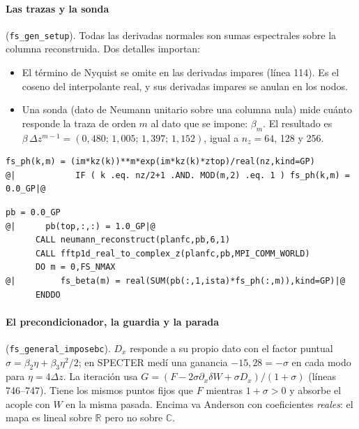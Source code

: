 \documentclass[11pt,a4paper]{article}
\begin{document}
\paragraph{Las trazas y la sonda} (\texttt{fs\_gen\_setup}). Todas las derivadas normales son
sumas espectrales sobre la columna reconstruida. Dos detalles importan:
\begin{itemize}
\item El término de Nyquist se omite en las derivadas impares (línea 114). Es el coseno del
  interpolante real, y sus derivadas impares se anulan en los nodos.
\item Una sonda (dato de Neumann unitario sobre una columna nula) mide cuánto responde la traza
  de orden $m$ al dato que se impone: $\beta_m$. El resultado es
  $\beta\,\Delta z^{m-1}=(0{,}480;\,1{,}005;\,1{,}397;\,1{,}152)$, igual a $n_z=64$, 128 y 256.
\end{itemize}
\begin{lstlisting}[style=f90,firstnumber=113]
            fs_ph(k,m) = (im*kz(k))**m*exp(im*kz(k)*ztop)/real(nz,kind=GP)
@|            IF ( k .eq. nz/2+1 .AND. MOD(m,2) .eq. 1 ) fs_ph(k,m) = 0.0_GP|@
\end{lstlisting}
\vspace{-2pt}
\begin{lstlisting}[style=f90,firstnumber=128]
      pb = 0.0_GP
@|      pb(top,:,:) = 1.0_GP|@
      CALL neumann_reconstruct(planfc,pb,6,1)
      CALL fftp1d_real_to_complex_z(planfc,pb,MPI_COMM_WORLD)
      DO m = 0,FS_NMAX
@|         fs_beta(m) = real(SUM(pb(:,1,ista)*fs_ph(:,m)),kind=GP)|@
      ENDDO
\end{lstlisting}

\paragraph{El precondicionador, la guardia y la parada} (\texttt{fs\_general\_imposebc}).
$D_x$ responde a su propio dato con el factor puntual $\sigma=\beta_2\eta+\beta_3\eta^2/2$; en
SPECTER medí una ganancia $-15{,}28=-\sigma$ en cada modo para $\eta=4\Delta z$. La iteración usa
$G=(F-2\sigma\partial_x\delta W+\sigma D_x)/(1+\sigma)$ (líneas 746--747). Tiene los mismos puntos
fijos que $F$ mientras $1+\sigma>0$ y absorbe el acople con $W$ en la misma pasada. Encima va
Anderson con coeficientes \emph{reales}: el mapa es lineal sobre $\mathbb R$ pero no sobre
$\mathbb C$.
\end{document}
